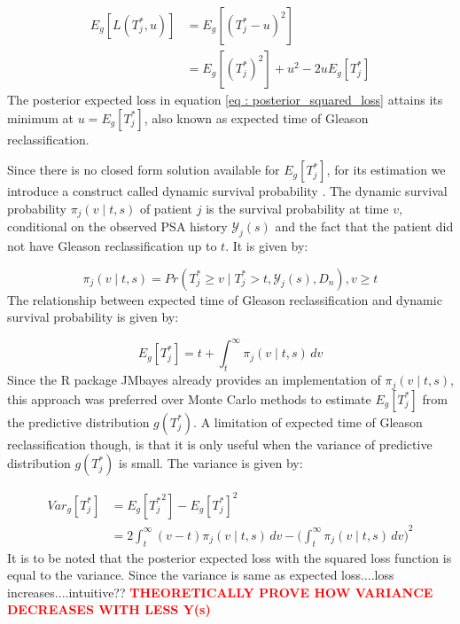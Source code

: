 \begin{equation}
\label{eq : posterior_squared_loss}
\begin{split}
E_g[L(T^*_j, u)] &= E_g[(T^*_j - u)^2]\\
&=E_g[(T^*_j)^2] + u^2 -2uE_g[T^*_j]
\end{split}
\end{equation}
The posterior expected loss in equation \ref{eq : posterior_squared_loss} attains its minimum at $u = E_g[T^*_j]$, also known as expected time of Gleason reclassification.

Since there is no closed form solution available for $E_g[T^*_j]$, for its estimation we introduce a construct called dynamic survival probability \citep{rizopoulos2011dynamic}. The dynamic survival probability $\pi_j(v \mid t, s)$ of patient $j$ is the survival probability at time $v$, conditional on the observed PSA history $\mathcal{Y}_j(s)$ and the fact that the patient did not have Gleason reclassification up to $t$. It is given by:

\begin{equation}
\pi_j(v \mid t, s) = Pr(T^*_j \geq v \mid  T^*_j >t, \mathcal{Y}_j(s), D_n), v \geq t
\end{equation}
The relationship between expected time of Gleason reclassification and dynamic survival probability is given by:

\begin{equation*}
E_g[T^*_j] = t + \int_t^\infty \pi_j(v \mid t, s) \,dv
\end{equation*}
Since the R package JMbayes already provides an implementation of $\pi_j(v \mid t, s)$, this approach was preferred over Monte Carlo methods to estimate $E_g[T^*_j]$ from the predictive distribution $g(T^*_j)$. A limitation of expected time of Gleason reclassification though, is that it is only useful when the variance of predictive distribution $g(T^*_j)$ is small. The variance is given by:

\begin{equation}
\begin{split}
Var_g[T^*_j] &= E_g[{T^*_j}^2] - {E_g[T^*_j]}^2\\
&= 2 \int_t^\infty {(v-t) \pi_j(v \mid t, s) \,dv} - {\bigg(\int_t^\infty \pi_j(v \mid t, s) \,dv\bigg)}^2
\end{split}
\end{equation}
It is to be noted that the posterior expected loss with the squared loss function is equal to the variance. Since the variance is same as expected loss....loss increases....intuitive??
\textcolor{red}{\textbf{THEORETICALLY PROVE HOW VARIANCE DECREASES WITH LESS Y(s)}}

